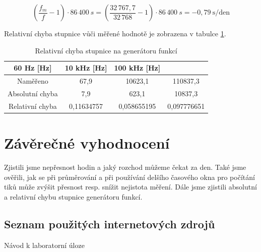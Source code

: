 \documentclass[a4paper,12pt]{article}   %
\begin{document}
\begin{equation}
  \left(\frac{f_m}{f}-1\right)\cdot 86\,400~s = \left(\frac{32\,767,7}{32\,768}-1\right)\cdot 86\,400~s = -0,79~\textrm{s/den}
  \label{eq:presnost_T}
\end{equation}

Relativní chyba stupnice vůči měřené hodnotě je zobrazena v tabulce \ref{tab:chyba}.
\begin{table}[h!]
  \centering
  \begin{tabular}{|c|c|c|c|}
    60 Hz [Hz]&10 kHz [Hz]&100 kHz [Hz]\\\hline\hline
    Naměřeno&67,9&10623,1&110837,3\\\hline
    Absolutní chyba&7,9&623,1&10837,3\\\hline
    Relativní chyba&0,11634757&0,058655195&0,097776651\\\hline
  \end{tabular}
  \label{tab:chyba}
  \caption{Relativní chyba stupnice na generátoru funkcí}
\end{table}

\section{Závěrečné vyhodnocení}
Zjistili jsme nepřesnost hodin a jaký rozchod můžeme čekat za den. Také jsme ověřili, jak se při průměrování a při používání delšího časového okna pro počítání tiků může zvýšit přesnost resp. snížit nejistota měření. Dále jsme zjistili absolutní a relativní chybu stupnice generátoru funkcí.

\clearpage
\renewcommand{\refname}{Seznam použité literatury a~zdrojů informací} 

\begin{thebibliography}{99}

\subsection*{Seznam použitých internetových zdrojů}
     Návod k laboratorní úloze
    
\end{thebibliography}
\end{document}
